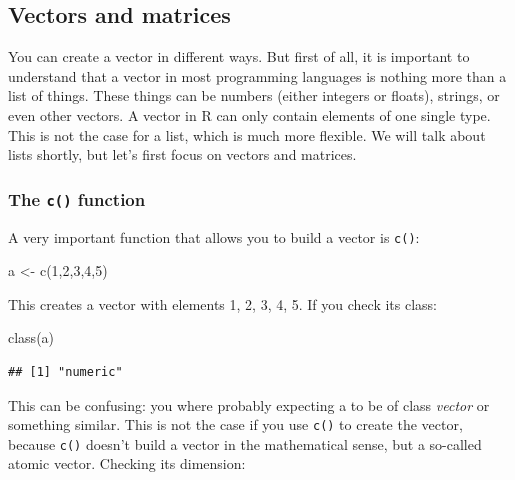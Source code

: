 \documentclass[
]{article}
\newenvironment{Shaded}{\begin{snugshade}}{\end{snugshade}}
\newcommand{\DecValTok}[1]{\textcolor[rgb]{0.00,0.00,0.81}{#1}}
\newcommand{\FunctionTok}[1]{\textcolor[rgb]{0.00,0.00,0.00}{#1}}
\newcommand{\NormalTok}[1]{#1}
\newcommand{\OtherTok}[1]{\textcolor[rgb]{0.56,0.35,0.01}{#1}}
\begin{document}
\hypertarget{vectors-and-matrices}{%
\subsection{Vectors and matrices}\label{vectors-and-matrices}}

You can create a vector in different ways. But first of all, it is important to understand that a
vector in most programming languages is nothing more than a list of things. These things can be
numbers (either integers or floats), strings, or even other vectors. A vector in R can only contain elements of one
single type. This is not the case for a list, which is much more flexible. We will talk about lists shortly, but
let's first focus on vectors and matrices.

\hypertarget{the-c-function}{%
\subsubsection{\texorpdfstring{The \texttt{c()} function}{The c() function}}\label{the-c-function}}

A very important function that allows you to build a vector is \texttt{c()}:

\begin{Shaded}
\begin{Highlighting}[]
\NormalTok{a }\OtherTok{\textless{}{-}} \FunctionTok{c}\NormalTok{(}\DecValTok{1}\NormalTok{,}\DecValTok{2}\NormalTok{,}\DecValTok{3}\NormalTok{,}\DecValTok{4}\NormalTok{,}\DecValTok{5}\NormalTok{)}
\end{Highlighting}
\end{Shaded}

This creates a vector with elements 1, 2, 3, 4, 5. If you check its class:

\begin{Shaded}
\begin{Highlighting}[]
\FunctionTok{class}\NormalTok{(a)}
\end{Highlighting}
\end{Shaded}

\begin{verbatim}
## [1] "numeric"
\end{verbatim}

This can be confusing: you where probably expecting a to be of class \emph{vector} or
something similar. This is not the case if you use \texttt{c()} to create the vector, because \texttt{c()}
doesn't build a vector in the mathematical sense, but a so-called atomic vector.
Checking its dimension:
\end{document}
